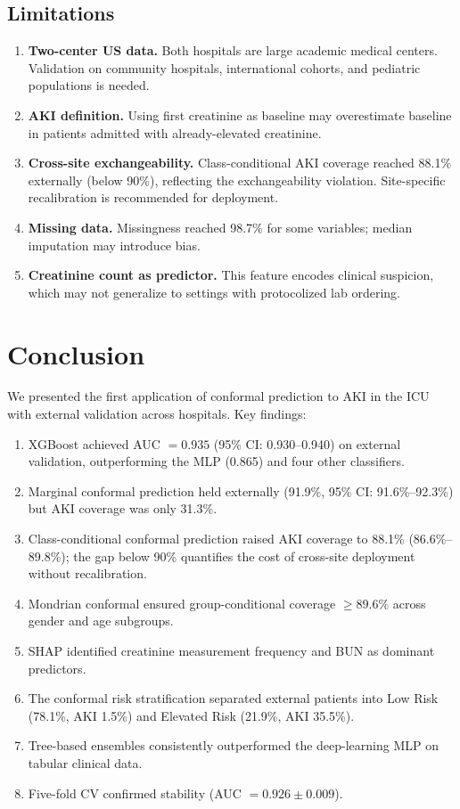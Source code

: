 \documentclass[12pt]{article}
\begin{document}
\subsection{Limitations}

\begin{enumerate}
\item \textbf{Two-center US data.}  Both hospitals are large
academic medical centers.  Validation on community hospitals,
international cohorts, and pediatric populations is needed.
\item \textbf{AKI definition.}  Using first creatinine as baseline
may overestimate baseline in patients admitted with
already-elevated creatinine.
\item \textbf{Cross-site exchangeability.}  Class-conditional AKI
coverage reached 88.1\% externally (below 90\%), reflecting the
exchangeability violation.  Site-specific recalibration is
recommended for deployment.
\item \textbf{Missing data.}  Missingness reached 98.7\% for some
variables; median imputation may introduce bias.
\item \textbf{Creatinine count as predictor.}  This feature encodes
clinical suspicion, which may not generalize to settings with
protocolized lab ordering.
\end{enumerate}


\section{Conclusion}
\label{sec:conclusion}

We presented the first application of conformal prediction to AKI
in the ICU with external validation across hospitals.  Key
findings:
\begin{enumerate}
\item XGBoost achieved AUC $= 0.935$ (95\% CI: 0.930--0.940)
on external validation, outperforming the MLP (0.865) and four
other classifiers.
\item Marginal conformal prediction held externally (91.9\%,
95\% CI: 91.6\%--92.3\%) but AKI coverage was only 31.3\%.
\item Class-conditional conformal prediction raised AKI coverage
to 88.1\% (86.6\%--89.8\%); the gap below 90\% quantifies the
cost of cross-site deployment without recalibration.
\item Mondrian conformal ensured group-conditional coverage
$\geq 89.6\%$ across gender and age subgroups.
\item SHAP identified creatinine measurement frequency and BUN as
dominant predictors.
\item The conformal risk stratification separated external patients
into Low Risk (78.1\%, AKI 1.5\%) and Elevated Risk (21.9\%,
AKI 35.5\%).
\item Tree-based ensembles consistently outperformed the
deep-learning MLP on tabular clinical data.
\item Five-fold CV confirmed stability
(AUC $= 0.926 \pm 0.009$).
\end{enumerate}
\end{document}
